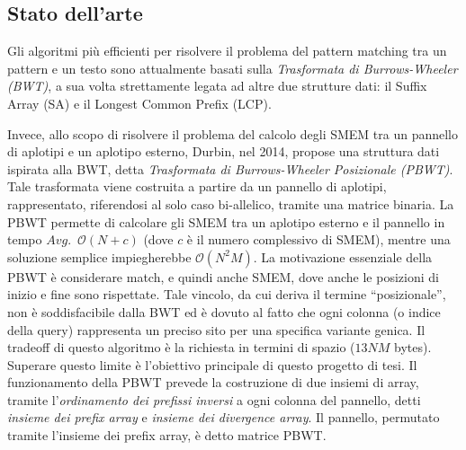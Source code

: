 \documentclass[a4paper,11pt, oneside,italian]{article}
\begin{document}
\subsection*{Stato dell'arte}
Gli algoritmi più efficienti per risolvere il problema del pattern matching tra
un pattern e un testo 
sono attualmente basati sulla \emph{Trasformata di Burrows-Wheeler (BWT)}, a sua
volta strettamente legata ad altre due strutture dati: il Suffix Array (SA) e
il Longest Common Prefix (LCP). 

Invece, allo scopo di risolvere il problema del calcolo degli SMEM tra un
pannello di aplotipi e un aplotipo esterno,
Durbin, nel 2014, propose una struttura dati ispirata alla BWT, detta
\textit{Trasformata di Burrows-Wheeler Posizionale (PBWT)}. Tale trasformata
viene costruita a partire da un pannello di aplotipi, rappresentato, riferendosi
al solo caso bi-allelico, tramite una matrice binaria.
La PBWT permette di calcolare gli SMEM tra
un aplotipo esterno e il pannello in tempo $Avg.\,\,\,\mathcal{O}(N+c)$ (dove 
$c$ è il numero complessivo di SMEM), mentre 
una soluzione semplice impiegherebbe $\mathcal{O}(N^2M)$.
La motivazione essenziale della PBWT è considerare match, e quindi anche SMEM,
dove anche le posizioni di inizio e fine sono rispettate.
Tale vincolo, da cui deriva il termine
``posizionale'', non è soddisfacibile dalla BWT ed è dovuto al fatto che ogni 
colonna (o indice della query) rappresenta un preciso sito per una specifica
variante genica. Il tradeoff di questo algoritmo è la richiesta in termini di
spazio ($13NM$ 
bytes). Superare questo limite è l'obiettivo principale di
questo progetto di tesi.
Il funzionamento della PBWT prevede la costruzione di due insiemi di
array, tramite 
l'\textit{ordinamento dei prefissi inversi} a ogni colonna del pannello, detti
\textit{insieme dei prefix array} e \textit{insieme dei divergence array}.
Il pannello, permutato tramite l'insieme dei prefix array, è
detto matrice PBWT.
\end{document}

